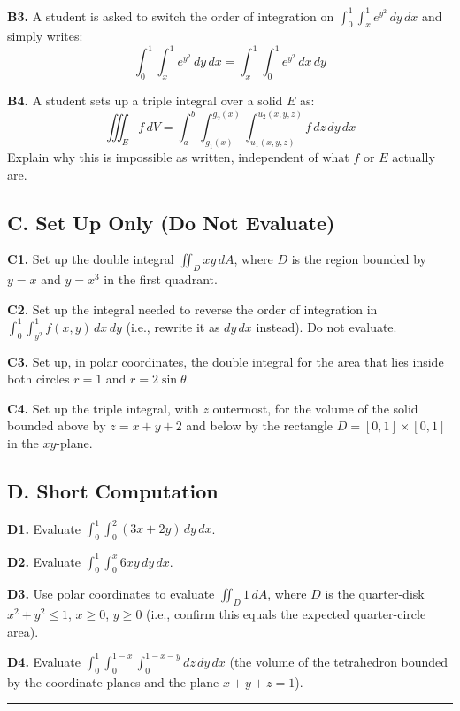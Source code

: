 \documentclass[11pt]{article}
\begin{document}
\textbf{B3.} A student is asked to switch the order of integration on $\displaystyle\int_0^1\int_x^1 e^{y^2}\, dy\, dx$ and simply writes:
\[
\int_0^1\int_x^1 e^{y^2}\, dy\, dx = \int_x^1\int_0^1 e^{y^2}\, dx\, dy
\]

\textbf{B4.} A student sets up a triple integral over a solid $E$ as:
\[
\iiint_E f\, dV = \int_a^b\int_{g_1(x)}^{g_2(x)}\int_{u_1(x,y,z)}^{u_2(x,y,z)} f\, dz\, dy\, dx
\]
Explain why this is impossible as written, independent of what $f$ or $E$ actually are.

\subsection*{C. Set Up Only (Do Not Evaluate)}

\textbf{C1.} Set up the double integral $\iint_D xy\, dA$, where $D$ is the region bounded by $y=x$ and $y=x^3$ in the first quadrant.

\textbf{C2.} Set up the integral needed to reverse the order of integration in $\displaystyle\int_0^1\int_{y^2}^{1} f(x,y)\, dx\, dy$ (i.e., rewrite it as $dy\,dx$ instead). Do not evaluate.

\textbf{C3.} Set up, in polar coordinates, the double integral for the area that lies inside both circles $r=1$ and $r=2\sin\theta$.

\textbf{C4.} Set up the triple integral, with $z$ outermost, for the volume of the solid bounded above by $z=x+y+2$ and below by the rectangle $D=[0,1]\times[0,1]$ in the $xy$-plane.

\subsection*{D. Short Computation}

\textbf{D1.} Evaluate $\displaystyle\int_0^1\int_0^2 (3x+2y)\, dy\, dx$.

\textbf{D2.} Evaluate $\displaystyle\int_0^1\int_0^{x} 6xy\, dy\, dx$.

\textbf{D3.} Use polar coordinates to evaluate $\displaystyle\iint_D 1\, dA$, where $D$ is the quarter-disk $x^2+y^2\le 1$, $x\ge0$, $y\ge0$ (i.e., confirm this equals the expected quarter-circle area).

\textbf{D4.} Evaluate $\displaystyle\int_0^1\int_0^{1-x}\int_0^{1-x-y} dz\, dy\, dx$ (the volume of the tetrahedron bounded by the coordinate planes and the plane $x+y+z=1$).

\bigskip
\hrule
\bigskip
\end{document}
